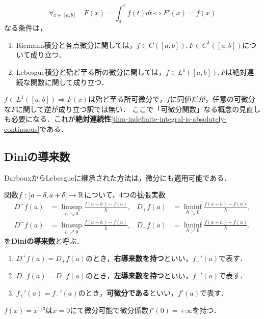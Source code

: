 \documentclass[uplatex, dvipdfmx]{jsreport}
\begin{document}
\begin{theorem}
    \[\forall_{x\in[a,b]}\quad F(x)=\int^x_af(t)dt\Leftrightarrow F'(x)=f(x)\]
    なる条件は，
    \begin{enumerate}
        \item Riemann積分と各点微分に関しては，$f\in C([a,b]),F\in C^1([a,b])$について成り立つ．
        \item Lebesgue積分と殆ど至る所の微分に関しては，$f\in L^1([a,b]),F$は絶対連続な関数に関して成り立つ．
    \end{enumerate}
\end{theorem}
\begin{remarks}
    $f\in L^1([a,b])\Rightarrow F(x)$は殆ど至る所可微分で，$f$に同値だが，任意の可微分な$F$に関して逆が成り立つ訳では無い．
    ここで「可微分関数」なる概念の見直しも必要になる．これが\textbf{絶対連続性}\ref{thm-indefinite-integral-is-absolutely-continuous}である．
\end{remarks}

\subsection{Diniの導来数}

\begin{tcolorbox}[colframe=ForestGreen, colback=ForestGreen!10!white,breakable,colbacktitle=ForestGreen!40!white,coltitle=black,fonttitle=\bfseries\sffamily,
title=]
    DarbouxからLebesgueに継承された方法は，微分にも適用可能である．
\end{tcolorbox}

\begin{definition}
    関数$f:[a-\delta,a+\delta]\to\mathbb{R}$について，4つの拡張実数
    \begin{align*}
        D^+f(a)&=\limsup_{h\searrow0}\frac{f(a+h)-f(a)}{h},&D_+f(a)&=\liminf_{h\searrow0}\frac{f(a+h)-f(a)}{h},\\
        D^-f(a)&=\limsup_{h\nearrow0}\frac{f(a+h)-f(a)}{h},&D_-f(a)&=\liminf_{h\nearrow0}\frac{f(a+h)-f(a)}{h}.
    \end{align*}
    を\textbf{Diniの導来数}と呼ぶ．
    \begin{enumerate}
        \item $D^+f(a)=D_+f(a)$のとき，\textbf{右導来数を持つ}といい，$f_+'(a)$で表す．
        \item $D^-f(a)=D_-f(a)$のとき，\textbf{左導来数を持つ}といい，$f_-'(a)$で表す．
        \item $f_+'(a)=f_-'(a)$のとき，\textbf{可微分である}といい，$f'(a)$で表す．
    \end{enumerate}
\end{definition}
\begin{example}
    $f(x)=x^{1/3}$は$x=0$にて微分可能で微分係数$f'(0)=+\infty$を持つ．
\end{example}
\end{document}
